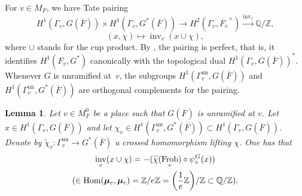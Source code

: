 \documentclass[a4paper,english,12pt]{amsart}
\newcommand{\QQ}{\mathbb{Q}}
\newcommand{\GG}{ G}
\newcommand{\oF}{\overline F}
\newcommand{\ZZ}{\mathbb{Z}}
\newcommand{\Fv}{F_v}
\newcommand{\Ov}{\mathcal O _v}
\newcommand{\AAA}{\mathbb A}
\newcommand{\muu}{\boldsymbol{\mu}}
\DeclareMathOperator{\Hom}{Hom}
\DeclareMathOperator{\Ta}{T}
\DeclareMathOperator{\Id}{Id}
\DeclareMathOperator{\Frob}{Frob}
\DeclareMathOperator{\un}{un}
\DeclareMathOperator{\inv}{inv}
\newtheorem{lem}[equation]{Lemma}
\newtheorem{prop}[equation]{Proposition}
\numberwithin{equation}{subsection}
\begin{document}
\subsubsection{}For $v\in M_F$, we have Tate pairing 
\begin{equation*}
H^1(\Gamma_v, G(\oF))\times H^1(\Gamma_v, G^*(\oF))\to H^2(\Gamma_v,\overline{\Fv}^{\times})\xrightarrow{\inv_v}\QQ/\ZZ, \end{equation*}\begin{equation*}(x,\chi)\mapsto \inv_v(x\cup \chi),
\end{equation*}
where $\cup$ stands for the cup product. %
%
By \cite[Corollary 2.3]{ArithmeticDuality}, the pairing is perfect, that is, it identifies $H^1(\Fv, G^*)$ canonically with the topological dual $H^1(\Gamma_v, G(\oF))^*$.  Whenever $G$ is unramified at~$v$, the subgroups $H^1(\Gamma_v^{\un}, G(\oF))$ and $H^1(\Gamma_v^{\un}, G^*(\oF))$ are orthogonal complements for the pairing. %
\begin{lem}\label{tatepairing}
Let $v\in M_F^0$ be a place such that $G(\overline F)$ is unramified at $v$. Let $x\in H^1(\Gamma_v, G(\overline F))$ and let $\chi_v\in H^1(\Gamma_v^{\un}, G^*(\overline F))\subset H^1(\Gamma_v, G(\oF)).$ Denote by $\widetilde\chi_v:\Gamma_v^{\un}\to G^*(\oF)$ a crossed homomorphism lifting $\chi$. One has that \begin{multline*}\inv_v(x\cup\chi)=-(\widetilde\chi(\Frob_v)\circ\psi^G_v(x))\\(\in\Hom(\muu_e,\muu_e)=\ZZ/e\ZZ=\bigg(\frac{1}{e}\ZZ\bigg)/\ZZ\subset\QQ/\ZZ).$$ %
\end{multline*}
\end{lem}
\end{document}
